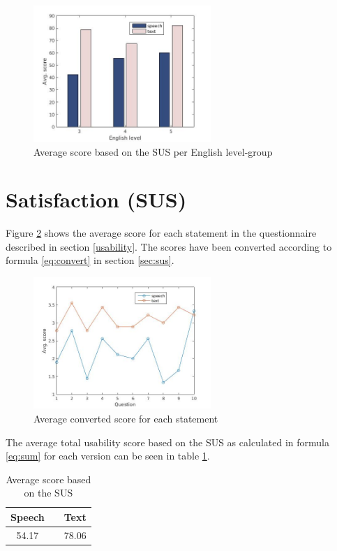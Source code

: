 \begin{figure}[ht]
  \centering
  \includegraphics[width=0.6\textwidth]{images/english_score.jpg}
  \caption{Average score based on the SUS per English level-group}\label{eng_score}
\end{figure}


\section{Satisfaction (SUS)}
Figure \ref{fig:sus_table} shows the average score for each statement in the questionnaire described in section \ref{usability}. The scores have been converted according to formula \ref{eq:convert} in section \ref{sec:sus}. 

\begin{figure}[ht]
  \centering
  \includegraphics[width=0.6\textwidth]{images/sus.jpg}
  \caption{Average converted score for each statement}\label{fig:sus_table}
\end{figure}

The average total usability score based on the SUS as calculated in formula \ref{eq:sum} for each version can be seen in table \ref{tot_score}.

\begin{table}[ht]
  \centering
  \begin{tabular}{ccc}
    \toprule
    Speech &   & Text\\
    \midrule
    54.17 &   & 78.06\\
    \bottomrule
  \end{tabular}
  \caption{Average score based on the SUS}\label{tot_score}
\end{table}